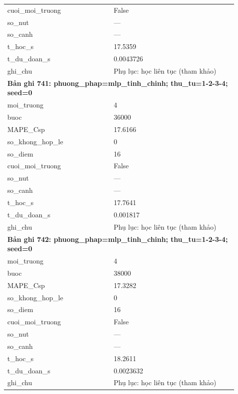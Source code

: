 \begin{longtable}{p{0.43\linewidth}p{0.50\linewidth}}
cuoi\_\allowbreak moi\_\allowbreak truong & False \\
so\_\allowbreak nut & — \\
so\_\allowbreak canh & — \\
t\_\allowbreak hoc\_\allowbreak s & 17.5359 \\
t\_\allowbreak du\_\allowbreak doan\_\allowbreak s & 0.0043726 \\
ghi\_\allowbreak chu & Phụ lục: học liên tục (tham khảo) \\
\midrule
\multicolumn{2}{p{0.95\linewidth}}{\textbf{Bản ghi 741: phuong\_phap=mlp\_tinh\_chinh; thu\_tu=1-2-3-4; seed=0}} \\
moi\_\allowbreak truong & 4 \\
buoc & 36000 \\
MAPE\_\allowbreak Csp & 17.6166 \\
so\_\allowbreak khong\_\allowbreak hop\_\allowbreak le & 0 \\
so\_\allowbreak diem & 16 \\
cuoi\_\allowbreak moi\_\allowbreak truong & False \\
so\_\allowbreak nut & — \\
so\_\allowbreak canh & — \\
t\_\allowbreak hoc\_\allowbreak s & 17.7641 \\
t\_\allowbreak du\_\allowbreak doan\_\allowbreak s & 0.001817 \\
ghi\_\allowbreak chu & Phụ lục: học liên tục (tham khảo) \\
\midrule
\multicolumn{2}{p{0.95\linewidth}}{\textbf{Bản ghi 742: phuong\_phap=mlp\_tinh\_chinh; thu\_tu=1-2-3-4; seed=0}} \\
moi\_\allowbreak truong & 4 \\
buoc & 38000 \\
MAPE\_\allowbreak Csp & 17.3282 \\
so\_\allowbreak khong\_\allowbreak hop\_\allowbreak le & 0 \\
so\_\allowbreak diem & 16 \\
cuoi\_\allowbreak moi\_\allowbreak truong & False \\
so\_\allowbreak nut & — \\
so\_\allowbreak canh & — \\
t\_\allowbreak hoc\_\allowbreak s & 18.2611 \\
t\_\allowbreak du\_\allowbreak doan\_\allowbreak s & 0.0023632 \\
ghi\_\allowbreak chu & Phụ lục: học liên tục (tham khảo) \\

\end{longtable}
